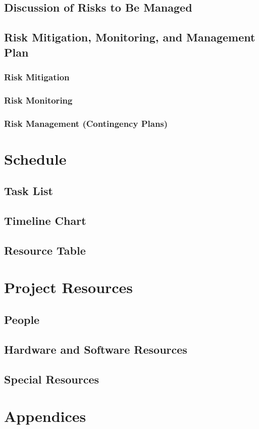 \documentclass[english,12pt]{article}
\begin{document}
\subsection{Discussion of Risks to Be Managed}

\subsection{Risk Mitigation, Monitoring, and Management Plan}

\subsubsection{Risk Mitigation}

\subsubsection{Risk Monitoring}

\subsubsection{Risk Management (Contingency Plans)}

\section{Schedule}

\subsection{Task List}

\subsection{Timeline Chart}

\subsection{Resource Table}

\section{Project Resources}

\subsection{People}

\subsection{Hardware and Software Resources}

\subsection{Special Resources}

\section{Appendices}
\end{document}
